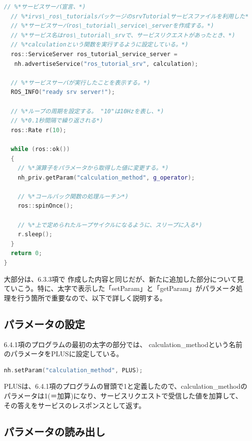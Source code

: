 \begin{lstlisting}[language=C++]
  // %*サービスサーバ宣言、*)
  // %*irvs\_ros\_tutorialsパッケージのsrvTutorialサービスファイルを利用した*)
  // %*サービスサーバros\_tutorial\_service\_serverを作成する。*)
  // %*サービス名はros\_tutorial\_srvで、サービスリクエストがあったとき、*)
  // %*calculationという関数を実行するように設定している。*)
  ros::ServiceServer ros_tutorial_service_server =
   nh.advertiseService("ros_tutorial_srv", calculation);

  // %*サービスサーバが実行したことを表示する。*)
  ROS_INFO("ready srv server!");

  // %*ループの周期を設定する。 "10"は10Hzを表し、*)
  // %*0.1秒間隔で繰り返される*)
  ros::Rate r(10);

  while (ros::ok())
  {
    // %*演算子をパラメータから取得した値に変更する。*)
    nh_priv.getParam("calculation_method", g_operator);

    // %*コールバック関数の処理ルーチン*)
    ros::spinOnce();

    // %*上で定められたループサイクルになるように、スリープに入る*)
    r.sleep();
  }
  return 0;
}
\end{lstlisting}

大部分は、6.3.3項で  作成した内容と同じだが、新たに追加した部分について見ていこう。特に、太字で表示した「setParam」と「getParam」がパラメータ処理を行う箇所で重要なので、以下で詳しく説明する。

\subsection{パラメータの設定}

6.4.1項のプログラムの最初の太字の部分では、  calculation\_methodという名前のパラメータをPLUSに設定している。

\begin{lstlisting}[language=C++]
nh.setParam("calculation_method", PLUS);
\end{lstlisting}

PLUSは、6.4.1項のプログラムの冒頭で1と定義したので、calculation\_methodのパラメータは1(＝加算)になり、サービスリクエストで受信した値を加算して、その答えをサービスのレスポンスとして返す。

\subsection{パラメータの読み出し}

